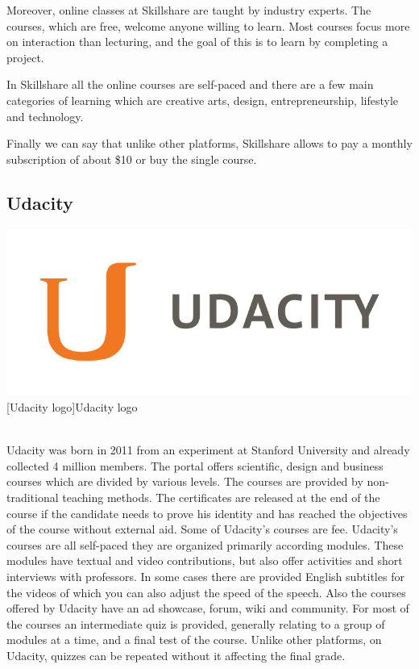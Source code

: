 Moreover, online classes at Skillshare are taught by industry experts. The courses, which are free, welcome anyone willing to learn. Most courses focus more on interaction than lecturing, and the goal of this is to learn by completing a project.

In Skillshare all the online courses are self-paced and there are a few main categories of learning which are creative arts, design, entrepreneurship, lifestyle and technology.

Finally we can say that unlike other platforms, Skillshare allows to pay a monthly subscription of about \$10 or buy the single course.


\subsection{Udacity}
\label{subsec:udacity}

\begin{minipage}{\linewidth}
      \centering
      \includegraphics[width=0.5\linewidth]{images/chapter1/udacity.png}
      [Udacity logo]{Udacity logo}
  \end{minipage}
  \\


Udacity was born in 2011 from an experiment at Stanford University and already collected 4 million members. The portal offers scientific, design and business courses which are divided by various levels. The courses are provided by non-traditional teaching methods.
The certificates are released at the end of the course if the candidate needs to prove his identity and has reached the objectives of the course without external aid. Some of Udacity's courses are fee.
Udacity’s courses are all self-paced they are organized primarily according modules. These modules have textual and video contributions, but also offer activities and short interviews with professors. In some cases there are provided English subtitles for the videos of which you can also adjust the speed of the speech.
Also the courses offered by Udacity have an ad showcase, forum, wiki and community. For most of the courses an intermediate quiz is provided, generally relating to a group of modules at a time, and a final test of the course. Unlike other platforms, on Udacity, quizzes can be repeated without it affecting the final grade.

